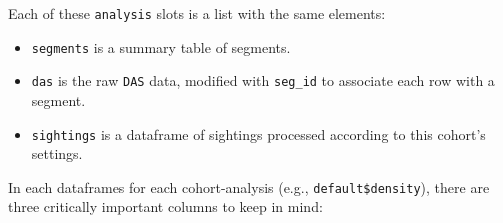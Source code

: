 \documentclass[
]{book}
\newenvironment{Shaded}{\begin{snugshade}}{\end{snugshade}}
\newcommand{\DataTypeTok}[1]{\textcolor[rgb]{0.13,0.29,0.53}{#1}}
\newcommand{\DecValTok}[1]{\textcolor[rgb]{0.00,0.00,0.81}{#1}}
\newcommand{\KeywordTok}[1]{\textcolor[rgb]{0.13,0.29,0.53}{\textbf{#1}}}
\newcommand{\NormalTok}[1]{#1}
\newcommand{\OperatorTok}[1]{\textcolor[rgb]{0.81,0.36,0.00}{\textbf{#1}}}
\newcommand{\OtherTok}[1]{\textcolor[rgb]{0.56,0.35,0.01}{#1}}
\newcommand{\StringTok}[1]{\textcolor[rgb]{0.31,0.60,0.02}{#1}}
\begin{document}
\begin{Shaded}
\end{Shaded}

Each of these \texttt{analysis} slots is a list with the same elements:

\begin{Shaded}
\end{Shaded}

\begin{itemize}
\item
  \texttt{segments} is a summary table of segments.
\item
  \texttt{das} is the raw \texttt{DAS} data, modified with \texttt{seg\_id} to associate each row with a segment.
\item
  \texttt{sightings} is a dataframe of sightings processed according to this cohort's settings.
\end{itemize}

In each dataframes for each cohort-analysis (e.g., \texttt{default\$density}), there are three critically important columns to keep in mind:
\end{document}
